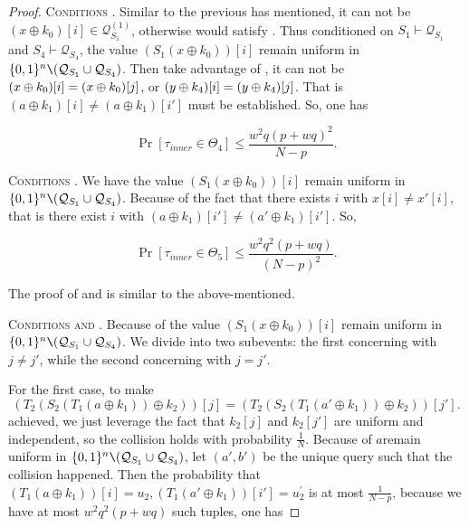 \begin{proof}
\textsc{Conditions \cfour}. Similar to the previous has mentioned, it can not be $\left(x \oplus k_{0}\right)[i] \in \mathcal{Q}_{S_{1}}^{(1)}$, otherwise would satisfy \btwo. Thus conditioned on $S_{1} \vdash \mathcal{Q}_{S_{1}}$ and $S_{4} \vdash \mathcal{Q}_{S_{4}}$, the value $\left(S_{1}\left(x \oplus k_{0}\right)\right)[i]$ remain uniform in $\{0, 1\}^{n} \verb|\| (\mathcal{Q}_{S_{1}} \cup \mathcal{Q}_{S_{4}})$. Then take advantage of \bfour, it can not be $(x\oplus k_0)[i]=(x\oplus k_0)[j]$, or $(y\oplus k_4)[i]=(y\oplus k_4)[j]$. That is $\left(a \oplus k_{1}\right)[i] \neq \left(a \oplus k_{1}\right)[i']$ must be established. So, one has

$$
\operatorname{Pr}\left[\tau_{inner} \in \Theta_{4}\right] \leq \frac{w^{2} q (p+w q)^{2}}{N-p}.
$$



\textsc{Conditions \cfive}. We have the value $\left(S_{1}\left(x \oplus k_{0}\right)\right)[i]$ remain uniform in $\{0, 1\}^{n} \verb|\| (\mathcal{Q}_{S_{1}} \cup \mathcal{Q}_{S_{4}})$.  Because of the fact that there exists $i$ with $x[i]\neq x'[i]$, that is there exist $i$ with $\left(a \oplus k_{1}\right)[i'] \neq \left(a' \oplus k_{1}\right)[i']$. So,

$$
\operatorname{Pr}\left[\tau_{inner} \in \Theta_{5}\right] \leq \frac{w^{2} q^{2} (p+w q)}{(N-p)^2}.
$$



The proof of \cseven and \ceight is similar to the above-mentioned.



\textsc{Conditions \csix and \cnine}. Because of the value $\left(S_{1}\left(x \oplus k_{0}\right)\right)[i]$ remain uniform in $\{0, 1\}^{n} \verb|\| (\mathcal{Q}_{S_{1}} \cup \mathcal{Q}_{S_{4}})$. We divide \csix into two subevents: the first concerning with $j\neq j'$, while the second concerning with $j=j'$.

For the first case, to make 
%
$$
 \left(T_{2}\left(S_{2}\left(T_1\left(a \oplus k_{1}\right)\right) \oplus k_{2}\right)\right)[j] = \left(T_{2}\left(S_{2}\left(T_1\left(a' \oplus k_{1}\right)\right) \oplus k_{2}\right)\right)[j'].
$$
%
achieved, we just leverage the fact that $k_2[j]$ and $k_2[j']$ are uniform and independent, so the collision holds with probability $\frac{1}{N}$. Because of $a$remain uniform in $\{0, 1\}^{n} \verb|\| (\mathcal{Q}_{S_{1}} \cup \mathcal{Q}_{S_{4}})$, let $(a', b')$ be the unique query such that the collision happened. Then the probability that $\left(T_1\left(a \oplus k_{1}\right)\right)[i] = u_2, \left(T_1\left(a' \oplus k_{1}\right)\right)[i'] = u_2^{\prime}$ is at most $\frac{1}{N-p}$, because we have at most $w^2 q^2(p+ w q)$ such tuples, one has


\end{proof}
